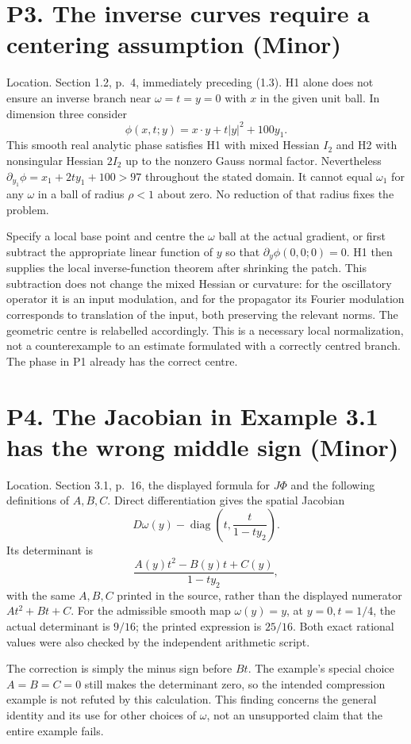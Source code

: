 \documentclass[10pt]{article}
\begin{document}
\section*{P3. The inverse curves require a centering assumption (Minor)}
Location. Section 1.2, p. 4, immediately preceding (1.3). H1 alone does not ensure an inverse branch near \(\omega=t=y=0\) with \(x\) in the given unit ball. In dimension three consider \[\phi(x,t;y)=x\cdot y+t|y|^2+100y_1.\] This smooth real analytic phase satisfies H1 with mixed Hessian \(I_2\) and H2 with nonsingular Hessian \(2I_2\) up to the nonzero Gauss normal factor. Nevertheless \(\partial_{y_1}\phi=x_1+2ty_1+100>97\) throughout the stated domain. It cannot equal \(\omega_1\) for any \(\omega\) in a ball of radius \(\rho<1\) about zero. No reduction of that radius fixes the problem.\par
Specify a local base point and centre the \(\omega\) ball at the actual gradient, or first subtract the appropriate linear function of \(y\) so that \(\partial_y\phi(0,0;0)=0\). H1 then supplies the local inverse-function theorem after shrinking the patch. This subtraction does not change the mixed Hessian or curvature: for the oscillatory operator it is an input modulation, and for the propagator its Fourier modulation corresponds to translation of the input, both preserving the relevant norms. The geometric centre is relabelled accordingly. This is a necessary local normalization, not a counterexample to an estimate formulated with a correctly centred branch. The phase in P1 already has the correct centre.\par
\section*{P4. The Jacobian in Example 3.1 has the wrong middle sign (Minor)}
Location. Section 3.1, p. 16, the displayed formula for \(J\Phi\) and the following definitions of \(A,B,C\). Direct differentiation gives the spatial Jacobian \[D\omega(y)-\operatorname{diag}\left(t,\frac{t}{1-ty_2}\right).\] Its determinant is \[\frac{A(y)t^2-B(y)t+C(y)}{1-ty_2},\] with the same \(A,B,C\) printed in the source, rather than the displayed numerator \(At^2+Bt+C\). For the admissible smooth map \(\omega(y)=y\), at \(y=0,t=1/4\), the actual determinant is \(9/16\); the printed expression is \(25/16\). Both exact rational values were also checked by the independent arithmetic script.\par
The correction is simply the minus sign before \(Bt\). The example’s special choice \(A=B=C=0\) still makes the determinant zero, so the intended compression example is not refuted by this calculation. This finding concerns the general identity and its use for other choices of \(\omega\), not an unsupported claim that the entire example fails.\par
\end{document}
